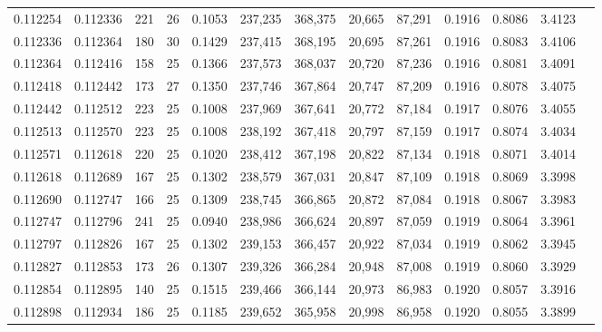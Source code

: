 \begin{tabular}{rrrrrrrrrrrrr}
0.112254 & 0.112336 & 221 &  26 &                                     0.1053 & 237,235 & 368,375 &  20,665 &  87,291 & 0.1916 & 0.8086 & 3.4123 \\
0.112336 & 0.112364 & 180 &  30 &                                     0.1429 & 237,415 & 368,195 &  20,695 &  87,261 & 0.1916 & 0.8083 & 3.4106 \\
0.112364 & 0.112416 & 158 &  25 &                                     0.1366 & 237,573 & 368,037 &  20,720 &  87,236 & 0.1916 & 0.8081 & 3.4091 \\
0.112418 & 0.112442 & 173 &  27 &                                     0.1350 & 237,746 & 367,864 &  20,747 &  87,209 & 0.1916 & 0.8078 & 3.4075 \\
0.112442 & 0.112512 & 223 &  25 &                                     0.1008 & 237,969 & 367,641 &  20,772 &  87,184 & 0.1917 & 0.8076 & 3.4055 \\
0.112513 & 0.112570 & 223 &  25 &                                     0.1008 & 238,192 & 367,418 &  20,797 &  87,159 & 0.1917 & 0.8074 & 3.4034 \\
0.112571 & 0.112618 & 220 &  25 &                                     0.1020 & 238,412 & 367,198 &  20,822 &  87,134 & 0.1918 & 0.8071 & 3.4014 \\
0.112618 & 0.112689 & 167 &  25 &                                     0.1302 & 238,579 & 367,031 &  20,847 &  87,109 & 0.1918 & 0.8069 & 3.3998 \\
0.112690 & 0.112747 & 166 &  25 &                                     0.1309 & 238,745 & 366,865 &  20,872 &  87,084 & 0.1918 & 0.8067 & 3.3983 \\
0.112747 & 0.112796 & 241 &  25 &                                     0.0940 & 238,986 & 366,624 &  20,897 &  87,059 & 0.1919 & 0.8064 & 3.3961 \\
0.112797 & 0.112826 & 167 &  25 &                                     0.1302 & 239,153 & 366,457 &  20,922 &  87,034 & 0.1919 & 0.8062 & 3.3945 \\
0.112827 & 0.112853 & 173 &  26 &                                     0.1307 & 239,326 & 366,284 &  20,948 &  87,008 & 0.1919 & 0.8060 & 3.3929 \\
0.112854 & 0.112895 & 140 &  25 &                                     0.1515 & 239,466 & 366,144 &  20,973 &  86,983 & 0.1920 & 0.8057 & 3.3916 \\
0.112898 & 0.112934 & 186 &  25 &                                     0.1185 & 239,652 & 365,958 &  20,998 &  86,958 & 0.1920 & 0.8055 & 3.3899 \\

\end{tabular}
